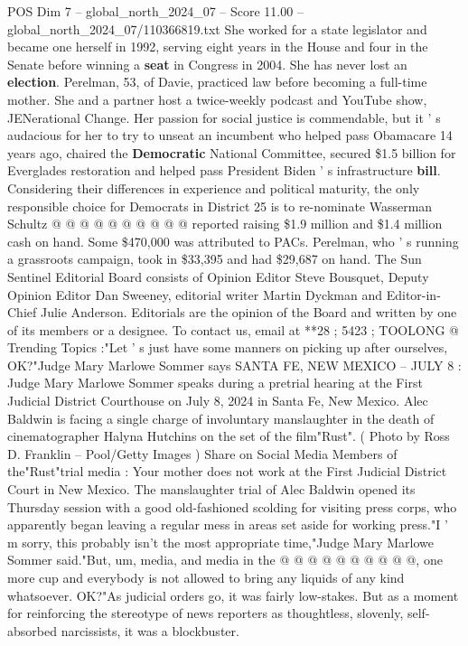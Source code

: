 \begin{textsample}{POS Dim 7 – global\_north\_2024\_07 – Score 11.00 – global\_north\_2024\_07/110366819.txt}
She worked for a state legislator and became one herself in 1992, serving eight years in the House and four in the Senate before winning a \textbf{seat} in Congress in 2004.
She has never lost an \textbf{election}.
Perelman, 53, of Davie, practiced law before becoming a full-time mother.
She and a partner host a twice-weekly podcast and YouTube show, JENerational Change.
Her passion for social justice is commendable, but it ' s audacious for her to try to unseat an incumbent who helped pass Obamacare 14 years ago, chaired the \textbf{Democratic} National Committee, secured \$1.5 billion for Everglades restoration and helped pass President Biden ' s infrastructure \textbf{bill}.
Considering their differences in experience and political maturity, the only responsible choice for Democrats in District 25 is to re-nominate Wasserman Schultz @ @ @ @ @ @ @ @ @ @ reported raising \$1.9 million and \$1.4 million cash on hand.
Some \$470,000 was attributed to PACs.
Perelman, who ' s running a grassroots campaign, took in \$33,395 and had \$29,687 on hand.
The Sun Sentinel Editorial Board consists of Opinion Editor Steve Bousquet, Deputy Opinion Editor Dan Sweeney, editorial writer Martin Dyckman and Editor-in-Chief Julie Anderson.
Editorials are the opinion of the Board and written by one of its members or a designee.
To contact us, email at **28 ; 5423 ; TOOLONG @ Trending Topics :"Let ' s just have some manners on picking up after ourselves, OK?"Judge Mary Marlowe Sommer says SANTA FE, NEW MEXICO -- JULY 8 : Judge Mary Marlowe Sommer speaks during a pretrial hearing at the First Judicial District Courthouse on July 8, 2024 in Santa Fe, New Mexico.
Alec Baldwin is facing a single charge of involuntary manslaughter in the death of cinematographer Halyna Hutchins on the set of the film"Rust". ( Photo by Ross D.
Franklin -- Pool/Getty Images ) Share on Social Media Members of the"Rust"trial media : Your mother does not work at the First Judicial District Court in New Mexico.
The manslaughter trial of Alec Baldwin opened its Thursday session with a good old-fashioned scolding for visiting press corps, who apparently began leaving a regular mess in areas set aside for working press."I ' m sorry, this probably isn't the most appropriate time,"Judge Mary Marlowe Sommer said."But, um, media, and media in the @ @ @ @ @ @ @ @ @ @, one more cup and everybody is not allowed to bring any liquids of any kind whatsoever.
OK?"As judicial orders go, it was fairly low-stakes.
But as a moment for reinforcing the stereotype of news reporters as thoughtless, slovenly, self-absorbed narcissists, it was a blockbuster.

\end{textsample}
